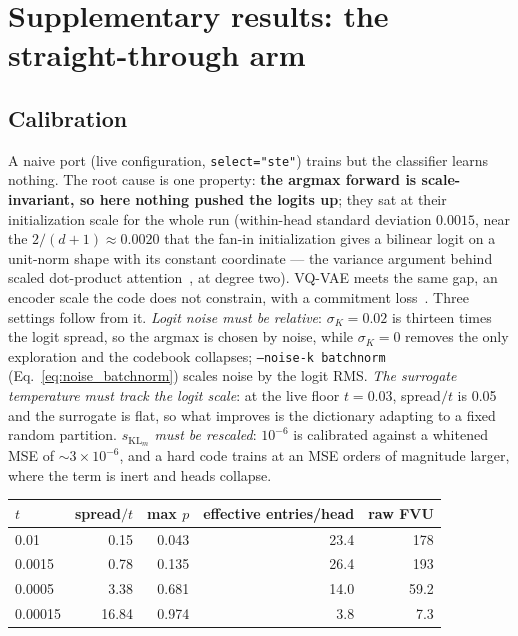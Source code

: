 \section{Supplementary results: the straight-through arm}
\label{app:ste}

\subsection{Calibration}
\label{sec:calib}

A naive port (live configuration, \texttt{select="ste"}) trains but the
classifier learns nothing. The root cause is one property: \textbf{the
argmax forward is scale-invariant, so here nothing pushed the logits up};
they sat at their initialization scale for the whole run (within-head
standard deviation $0.0015$, near the $2/(d{+}1) \approx 0.0020$ that the
fan-in initialization gives a bilinear logit on a unit-norm shape with its
constant coordinate --- the variance argument behind scaled dot-product
attention~\cite[fn.~4]{vaswani2017}, at degree two). VQ-VAE meets the same gap, an encoder scale
the code does not constrain, with a commitment loss~\cite{vandenoord2017}.
Three settings follow from it.
\emph{Logit noise must be relative}: $\sigma_K{=}0.02$ is thirteen times
the logit spread, so the argmax is chosen by noise, while $\sigma_K{=}0$
removes the only exploration and the codebook collapses;
\texttt{--noise-k batchnorm} (Eq.~\eqref{eq:noise_batchnorm}) scales
noise by the logit RMS. \emph{The surrogate temperature must track the
logit scale}: at the live floor $t{=}0.03$, spread$/t$ is 0.05 and the
surrogate is flat, so what improves is the dictionary adapting to a fixed
random partition. \emph{$s_{\mathrm{KL}_m}$ must be rescaled}: $10^{-6}$ is
calibrated against a whitened MSE of $\sim$$3\times10^{-6}$, and a hard
code trains at an MSE orders of magnitude larger, where the term is inert
and heads collapse.

\begin{center}\small
\begin{tabular}{@{}lrrrr@{}}
\toprule
$t$ & spread$/t$ & max $p$ & effective entries/head & raw FVU \\
\midrule
0.01    & 0.15  & 0.043 & 23.4 & 178 \\
0.0015  & 0.78  & 0.135 & 26.4 & 193 \\
0.0005  & 3.38  & 0.681 & 14.0 & 59.2 \\
0.00015 & 16.84 & 0.974 & 3.8  & 7.3 \\
\bottomrule
\end{tabular}
\end{center}

